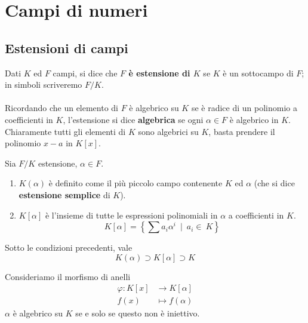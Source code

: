 \section{Campi di numeri}
\subsection{Estensioni di campi}
\label{lezione16}
\begin{definizione}
	Dati $K$ ed $F$ campi, si dice che \textbf{$F$ è estensione di $K$} se $K$ è un sottocampo di $F$; in simboli scriveremo $F/K$. \\ \\ Ricordando che un elemento di $F$ è algebrico su $K$ se è radice di un polinomio a coefficienti in $K$, l'estensione si dice \textbf{algebrica} se ogni $\alpha\in F$ è algebrico in $K$. \\ Chiaramente tutti gli elementi di $K$ sono algebrici su $K$, basta prendere il polinomio $x-a$ in $K[x]$.
\end{definizione}
\begin{definizione}
	Sia $F/K$ estensione, $\alpha\in F$.
	\begin{enumerate}
		\item $K(\alpha)$ è definito come il più piccolo campo contenente $K$ ed $\alpha$ (che si dice \textbf{estensione semplice} di $K$).
		\item $K[\alpha]$ è l'insieme di tutte le espressioni polinomiali in $\alpha$ a coefficienti in $K$.
		\begin{equation*}
		K[\alpha]=\left\{\sum a_i\alpha^i \ \mid \ a_i\in\ K\right\}
		\end{equation*}
	\end{enumerate}
\end{definizione}
\begin{proposizione} 
	Sotto le condizioni precedenti, vale
	\begin{equation*}
	K(\alpha)\supset K[\alpha] \supset K
	\end{equation*}
\end{proposizione}
\begin{proposizione}
	Consideriamo il morfismo di anelli 
	\begin{align*}
	\varphi: K[x] &\longrightarrow K[\alpha]\\
	f(x)&\longmapsto f(\alpha)
	\end{align*}
	$\alpha$ è algebrico su $K$ se e solo se questo non è iniettivo.
\end{proposizione}
